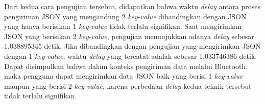 Dari kedua cara pengujian tersebut, didapatkan bahwa waktu \emph{delay} antara proses pengiriman JSON yang mengandung 2 \emph{key}-\emph{value} dibandingkan dengan JSON yang hanya berisikan 1 \emph{key}-\emph{value} tidak terlalu signifikan. Saat mengirimkan JSON yang berisikan 2 \emph{key}-\emph{value}, pengujian menunjukkan adanya \emph{delay} sebesar 1,038895345 detik. Jika dibandingkan dengan pengujian yang mengirimkan JSON dengan 1 \emph{key}-\emph{value}, waktu \emph{delay} yang tercatat adalah sebesar 1,033746386 detik. Dapat disimpulkan bahwa dalam konteks pengiriman data melalui Bluetooth, maka pengguna dapat mengirimkan data JSON baik yang berisi 1 \emph{key}-\emph{value} maupun yang berisi 2 \emph{key}-\emph{value}, karena perbedaan \emph{delay} kedua teknik tersebut tidak terlalu signifikan.

